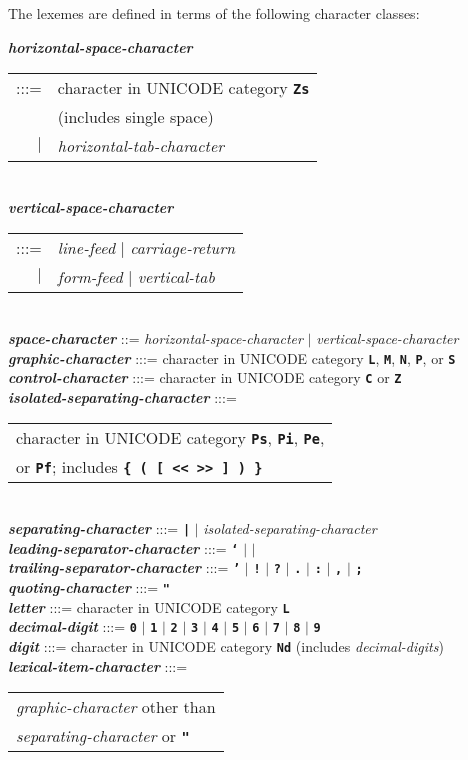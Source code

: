 \documentclass[12pt]{article}
\newcommand{\TT}[1]{{\tt \bfseries #1}}
\newcommand{\emkey}[1]{{\em \bfseries #1}}
\newenvironment{indpar}[1][0.3in]%
	{\begin{list}{}%
		     {\setlength{\itemsep}{0in}%
		      \setlength{\topsep}{0in}%
		      \setlength{\parsep}{1ex}%
		      \setlength{\labelwidth}{#1}%
		      \setlength{\leftmargin}{#1}%
		      \addtolength{\leftmargin}{\labelsep}}%
	 \item}%
	{\end{list}}
\begin{document}
The lexemes are defined in terms of the following character classes:

\begin{indpar}
\emkey{horizontal-space-character}
    \begin{tabular}[t]{rl}
    :::= & character in UNICODE category \TT{Zs} \\
         & (includes single space) \\
    $|$  & {\em horizontal-tab-character}
    \end{tabular}
\\
\emkey{vertical-space-character}
    \begin{tabular}[t]{rl}
    :::= & {\em line-feed} $|$ {\em carriage-return} \\
    $|$ & {\em form-feed} $|$ {\em vertical-tab}
    \end{tabular}
\\
\emkey{space-character} ::= {\em horizontal-space-character}
                        $|$ {\em vertical-space-character}
\\[1ex]
\emkey{graphic-character} :::= character in UNICODE category
                              \TT{L}, \TT{M}, \TT{N}, \TT{P}, or \TT{S}
\\
\emkey{control-character} :::=
	character in UNICODE category \TT{C} or \TT{Z}
\\[1ex]
\emkey{isolated-separating-character} :::=
    \begin{tabular}[t]{l}
    character in UNICODE category \TT{Ps}, \TT{Pi}, \TT{Pe}, \\
    or \TT{Pf}; includes \TT{\{ ( [ << >> ] ) \}}
    \end{tabular}
\\
\emkey{separating-character} :::= \TT{|} $|$ {\em isolated-separating-character}
\\[1ex]
\emkey{leading-separator-character} :::=
	\TT{`} $|$ \TT{\textexclamdown} $|$ \TT{\textquestiondown}
\\
\emkey{trailing-separator-character} :::=
	\TT{'} $|$ \TT{!} $|$ \TT{?} $|$ \TT{.} $|$ \TT{:}
	       $|$ \TT{,} $|$ \TT{;}
\\[1ex]
\emkey{quoting-character} :::= \TT{"}
\\[1ex]
\emkey{letter} :::=
    character in UNICODE category \TT{L}
\\
\emkey{decimal-digit} :::= \TT{0} $|$ \TT{1} $|$ \TT{2} $|$ \TT{3} $|$ \TT{4}
                       $|$ \TT{5} $|$ \TT{6} $|$ \TT{7} $|$ \TT{8} $|$ \TT{9}
\\
\emkey{digit} :::=
    character in UNICODE category \TT{Nd}
    (includes {\em decimal-digits})
\\
\emkey{lexical-item-character}\label{LEXICAL-ITEM-CHARACTER} :::=
	\begin{tabular}[t]{l}
        {\em graphic-character} other than \\
	{\em separating-character} or \TT{"}
	\end{tabular}
\end{indpar}
\end{document}
